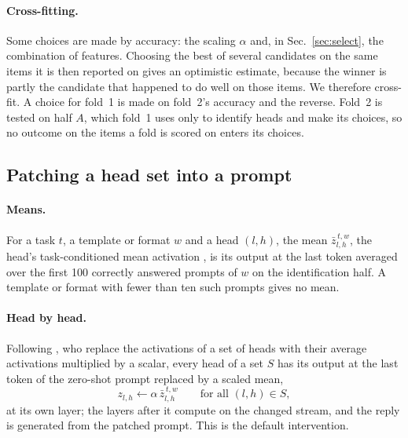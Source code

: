 \documentclass[10pt,a4paper]{article}
\newcommand{\zbar}{\bar z}
\begin{document}
\paragraph{Cross-fitting.} Some choices are made by accuracy: the scaling $\alpha$ and, in Sec.~\ref{sec:select}, the combination of features. Choosing the best of several candidates on the same items it is then reported on gives an optimistic estimate, because the winner is partly the candidate that happened to do well on those items. We therefore cross-fit. A choice for fold~1 is made on fold~2's accuracy and the reverse. Fold~2 is tested on half $A$, which fold~1 uses only to identify heads and make its choices, so no outcome on the items a fold is scored on enters its choices.

\subsection{Patching a head set into a prompt}\label{sec:patching}

\paragraph{Means.} For a task $t$, a template or format $w$ and a head $(l,h)$, the mean $\zbar^{\,t,w}_{l,h}$, the head's task-conditioned mean activation \citep{todd2024function}, is its output at the last token averaged over the first 100 correctly answered prompts of $w$ on the identification half. A template or format with fewer than ten such prompts gives no mean.

\paragraph{Head by head.} Following \citet[Secs.~2.3.2 and~2.4.1, App.~G]{yang2026shared}, who replace the activations of a set of heads with their average activations multiplied by a scalar, every head of a set $S$ has its output at the last token of the zero-shot prompt replaced by a scaled mean,
\begin{equation}
z_{l,h} \leftarrow \alpha\, \zbar^{\,t,w}_{l,h} \qquad \text{for all } (l,h)\in S,
\end{equation}
at its own layer; the layers after it compute on the changed stream, and the reply is generated from the patched prompt. This is the default intervention.
\end{document}
